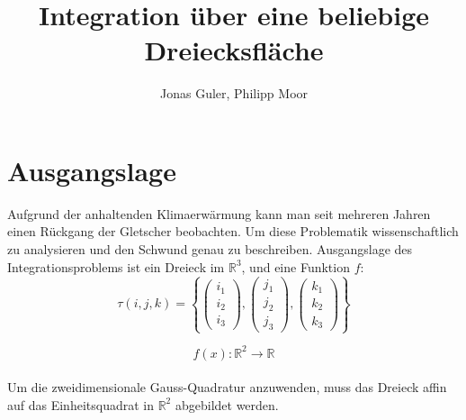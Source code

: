 \documentclass[12pt]{article}
\begin{document}
\title{Integration über eine beliebige Dreiecksfläche}
\author{Jonas Guler, Philipp Moor}
\maketitle
\pagestyle{scrheadings}
\clearscrheadfoot
{}
\ofoot{\pagemark}

\newpage

\section{Ausgangslage}
Aufgrund der anhaltenden Klimaerwärmung kann man seit mehreren Jahren einen Rückgang der Gletscher beobachten. Um diese Problematik wissenschaftlich zu analysieren und den Schwund genau zu beschreiben. 
Ausgangslage des Integrationsproblems ist ein Dreieck im $\mathbb{R}^3$, und eine Funktion $f$:
\[
\tau(i,j,k) =
\left \{
		 \begin{pmatrix} i_1\\ i_2 \\ i_3 \end{pmatrix}
		 ,
		 \begin{pmatrix} j_1\\ j_2 \\ j_3 \end{pmatrix}
		 ,
		 \begin{pmatrix} k_1\\ k_2 \\ k_3 \end{pmatrix}
\right \}
\]


\[
   f(x) : \mathbb{R}^2 \rightarrow \mathbb{R}
\]
\\
Um die zweidimensionale Gauss-Quadratur anzuwenden, muss das Dreieck affin auf das Einheitsquadrat in $\mathbb{R}^2$ abgebildet werden. \\
\\
\\
\end{document}
